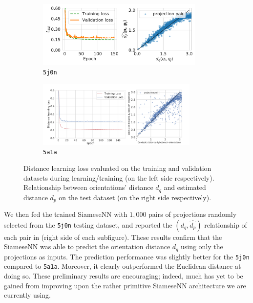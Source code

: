 \begin{figure}[ht!]
    \centering
    \begin{subfigure}[t]{0.45\linewidth}
        \includegraphics[height=3.3cm]{figures/de_loss_dPdQ_5j0n.pdf}
        \caption{\texttt{5j0n}}
        \label{fig:losses-siamese-assym}
    \end{subfigure} \quad \quad
    \begin{subfigure}[t]{0.5\linewidth}
        \includegraphics[height=3.3cm]{figures/de_loss_dPdQ_5a1a.pdf}
        \caption{\texttt{5a1a}}
        \label{fig:losses-siamese-sym}
    \end{subfigure}
    \caption{
        Distance learning loss  evaluated on the training and validation datasets during learning/training (on the left side respectively). Relationship between orientations' distance $d_q$ and estimated distance $d_p$ on the test dataset (on the right side respectively).
    }\label{fig:losses-siamese}
\end{figure}

 We then fed the trained SiameseNN with $1,000$ pairs of projections randomly selected from the \texttt{5j0n} testing dataset, and reported the $(d_q,\widehat{d_p})$ relationship of each pair in  (right side of each subfigure).
These results confirm that the SiameseNN was able to predict the orientation distance $d_q$ using only the projections as inputs.
The prediction performance was slightly better for the \texttt{5j0n} compared to \texttt{5a1a}. 
Moreover, it clearly outperformed the Euclidean distance at doing so.
These preliminary results are encouraging; indeed, much has yet to be gained from improving upon the rather primitive SiameseNN architecture we are currently using.

